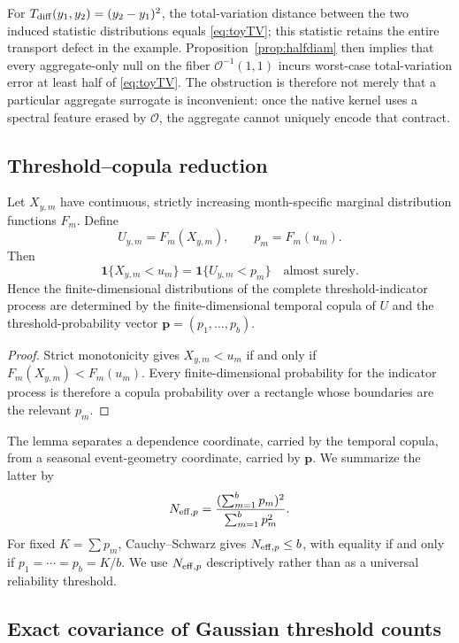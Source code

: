 For $T_{\rm diff}(y_1,y_2)=(y_2-y_1)^2$, the total-variation distance between the two induced statistic distributions equals \eqref{eq:toyTV}; this statistic retains the entire transport defect in the example. Proposition~\ref{prop:halfdiam} then implies that every aggregate-only null on the fiber $\mathcal O^{-1}(1,1)$ incurs worst-case total-variation error at least half of \eqref{eq:toyTV}. The obstruction is therefore not merely that a particular aggregate surrogate is inconvenient: once the native kernel uses a spectral feature erased by $\mathcal O$, the aggregate cannot uniquely encode that contract.

\subsection{Threshold--copula reduction}\label{sec:copula}

\begin{lemma}\label{lem:copula}
Let $X_{y,m}$ have continuous, strictly increasing month-specific marginal distribution functions $F_m$. Define
\[
U_{y,m}=F_m(X_{y,m}),\qquad p_m=F_m(u_m).
\]
Then
\[
\mathbf 1\{X_{y,m}<u_m\}=\mathbf 1\{U_{y,m}<p_m\}
\quad\text{almost surely}.
\]
Hence the finite-dimensional distributions of the complete threshold-indicator process are determined by the finite-dimensional temporal copula of $U$ and the threshold-probability vector $\mathbf p=(p_1,\ldots,p_b)$.
\end{lemma}

\begin{proof}
Strict monotonicity gives $X_{y,m}<u_m$ if and only if $F_m(X_{y,m})<F_m(u_m)$. Every finite-dimensional probability for the indicator process is therefore a copula probability over a rectangle whose boundaries are the relevant $p_m$.
\end{proof}

The lemma separates a dependence coordinate, carried by the temporal copula, from a seasonal event-geometry coordinate, carried by $\mathbf p$. We summarize the latter by
\begin{equation}
N_{\mathrm{eff},p}=\frac{(\sum_{m=1}^{b}p_m)^2}{\sum_{m=1}^{b}p_m^2}.
\label{eq:neff}
\end{equation}
For fixed $K=\sum p_m$, Cauchy--Schwarz gives $N_{\mathrm{eff},p}\le b$, with equality if and only if $p_1=\cdots=p_b=K/b$. We use $N_{\mathrm{eff},p}$ descriptively rather than as a universal reliability threshold.

\subsection{Exact covariance of Gaussian threshold counts}\label{sec:gausscov}

